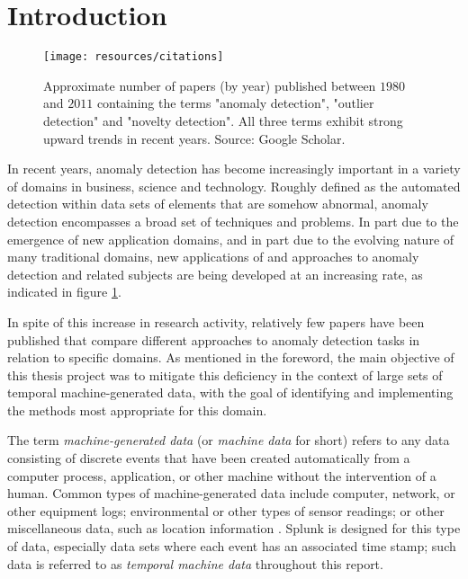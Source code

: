 \chapter*{Introduction}

\begin{figure}[htb]
    \vspace{-10pt}
    \begin{center}
        \texttt{[image: resources/citations]}
    \end{center}
    \vspace{-20pt}
    \caption{\small Approximate number of papers (by year) published between $1980$ and $2011$ containing the terms "anomaly detection", "outlier detection" and "novelty detection". All three terms exhibit strong upward trends in recent years. Source: Google Scholar.}
    \vspace{-0pt}
    \label{fig:citations}
\end{figure}

In recent years, anomaly detection has become increasingly important in a variety of domains in business, science and technology. Roughly defined as the automated detection within data sets of elements that are somehow abnormal, anomaly detection encompasses a broad set of techniques and problems. In part due to the emergence of new application domains, and in part due to the evolving nature of many traditional domains, new applications of and approaches to anomaly detection and related subjects are being developed at an increasing rate, as indicated in figure \ref{fig:citations}.

In spite of this increase in research activity, relatively few papers have been published that compare different approaches to anomaly detection tasks in relation to specific domains. As mentioned in the foreword, the main objective of this thesis project was to mitigate this deficiency in the context of large sets of temporal machine-generated data, with the goal of identifying and implementing the methods most appropriate for this domain.

The term \emph{machine-generated data} (or \emph{machine data} for short) refers to any data consisting of discrete events that have been created automatically from a computer process, application, or other machine without the intervention of a human. Common types of machine-generated data include computer, network, or other equipment logs; environmental or other types of sensor readings; or other miscellaneous data, such as location information \cite{machine_data}. Splunk is designed for this type of data, especially data sets where each event has an associated time stamp; such data is referred to as \emph{temporal machine data} throughout this report.


